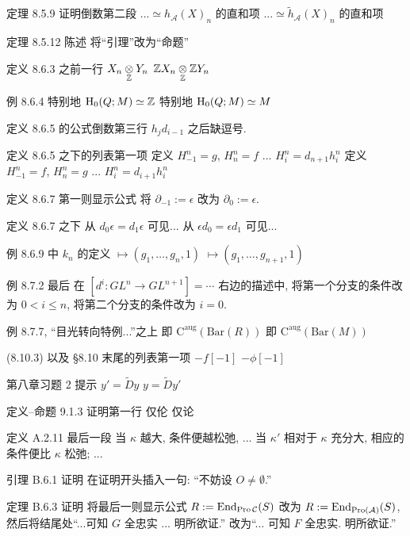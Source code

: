 \documentclass{AJerrata}
\begin{document}
\begin{Errata}
		\item[定理 8.5.9 证明倒数第二段]
		\Orig ...$\simeq h_{\mathcal{A}}(X)_n$ 的直和项
		\Corr ...$\simeq \tilde{h}_{\mathcal{A}}(X)_n$ 的直和项
		
		\item[定理 8.5.12 陈述]
		将``引理''改为``命题''
		
		\item[定义 8.6.3 之前一行]
		\Orig $X_n \underset{\mathbb{Z}}{\otimes} Y_n$
		\Corr $\mathbb{Z} X_n \underset{\mathbb{Z}}{\otimes} \mathbb{Z} Y_n$
		
		\item[例 8.6.4]
		\Orig 特别地 $\operatorname{H}_0(Q; M) \simeq \mathbb{Z}$
		\Corr 特别地 $\operatorname{H}_0(Q; M) \simeq M$
		
		\item[定义 8.6.5 的公式倒数第三行]
		$h_j d_{i-1}$ 之后缺逗号.
		
		\item[定义 8.6.5 之下的列表第一项]
		\Orig 定义 $H^n_{-1} = g$, $H^n_n = f$ ... $H^n_i = d_{n+1} h^n_i$
		\Corr 定义 $H^n_{-1} = f$, $H^n_n = g$ ... $H^n_i = d_{i+1} h^n_i$
		
		\item[定义 8.6.7 第一则显示公式]
		将 $\partial_{-1} := \epsilon$ 改为 $\partial_0 := \epsilon$.
		
		\item[定义 8.6.7 之下]
		\Orig 从 $d_0 \epsilon = d_1 \epsilon$ 可见...
		\Corr 从 $\epsilon d_0 = \epsilon d_1$ 可见...
		
		\item[例 8.6.9 中 $k_n$ 的定义]
		\Orig $\mapsto (g_1, \ldots, g_n, 1)$
		\Corr $\mapsto (g_1, \ldots, g_{n+1}, 1)$
		
		\item[例 8.7.2 最后]
		在 $[d^i: GL^n \to GL^{n+1}] = \cdots$ 右边的描述中, 将第一个分支的条件改为 $0 < i \leq n$, 将第二个分支的条件改为 $i = 0$.
		
		\item[例 8.7.7, ``目光转向特例...''之上]
		\Orig 即 $\mathrm{C}^{\mathrm{aug}}(\mathrm{Bar}(R))$
		\Corr 即 $\mathrm{C}^{\mathrm{aug}}(\mathrm{Bar}(M))$
		
		\item[(8.10.3) 以及 \S 8.10 末尾的列表第一项]
		\Orig $-f[-1]$
		\Corr $-\phi[-1]$
		
		\item[第八章习题 2 提示]
		\Orig $y' = \tilde{D}y$
		\Corr $y = \tilde{D}y'$
		
		\item[定义--命题 9.1.3 证明第一行]
		\Orig 仅伦
		\Corr 仅论
		
		\item[定义 A.2.11 最后一段]
		\Orig 当 $\kappa$ 越大, 条件便越松弛, ...
		\Corr 当 $\kappa'$ 相对于 $\kappa$ 充分大, 相应的条件便比 $\kappa$ 松弛; ...
		
		\item[引理 B.6.1 证明]
		在证明开头插入一句: ``不妨设 $O \neq \emptyset$.''
		
		\item[定理 B.6.3 证明]
		将最后一则显示公式 $R := \operatorname{End}_{\operatorname{Pro}\mathcal{C}}(S)$ 改为 $R := \operatorname{End}_{\operatorname{Pro}(\mathcal{A})}(S)$, 然后将结尾处``...可知 $G$ 全忠实 ... 明所欲证.'' 改为``... 可知 $F$ 全忠实. 明所欲证.''
	\end{Errata}
\end{document}

